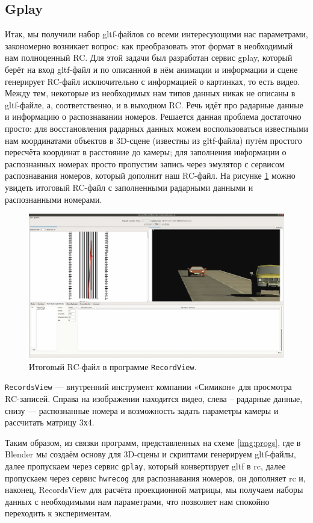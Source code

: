 \documentclass[specification,annotation,times]{itmo-student-thesis}
\begin{document}
\subsection{Gplay}
Итак, мы получили набор gltf-файлов со всеми интересующими нас параметрами, закономерно возникает вопрос: как преобразовать этот формат в необходимый нам полноценный RC. Для этой задачи был разработан сервис gplay, который берёт на вход gltf-файл и по описанной в нём анимации и информации и сцене генерирует RC-файл исключительно с информацией о картинках, то есть видео. Между тем, некоторые из необходимых нам типов данных никак не описаны в gltf-файле, а, соответственно, и в выходном RC. Речь идёт про радарные данные и информацию о распознавании номеров. Решается данная проблема достаточно просто: для восстановления радарных данных можем воспользоваться известными нам координатами объектов в 3D-сцене (известны из gltf-файла) путём простого пересчёта координат в расстояние до камеры; для заполнения информации о распознанных номерах просто пропустим запись через эмулятор с сервисом распознавания номеров, который дополнит наш RC-файл. На рисунке \ref{img:rv} можно увидеть итоговый RC-файл с заполненными радарными данными и распознанными номерами.

\begin{figure}[!ht]
	\caption{Итоговый RC-файл в программе \texttt{RecordView}.}\label{img:rv}
	\includegraphics[width=0.85\linewidth]{../png/recordsview.png}
	\centering
\end{figure}

\texttt{RecordsView} --- внутренний инструмент компании «Симикон» для просмотра RC-записей. Справа на изображении находится видео, слева -- радарные данные, снизу --- распознанные номера и возможность задать параметры камеры и рассчитать матрицу 3х4.

Таким образом, из связки программ, представленных на схеме \ref{img:progs}, где в Blender мы создаём основу для 3D-сцены и скриптами генерируем gltf-файлы, далее пропускаем через сервис \texttt{gplay}, который конвертирует gltf в rc, далее пропускаем через сервис \texttt{hwrecog} для распознавания номеров, он дополняет rc и, наконец, RecordsView для расчёта проекционной матрицы, мы получаем наборы данных с необходимыми нам параметрами, что позволяет нам спокойно переходить к экспериментам.
\end{document}
